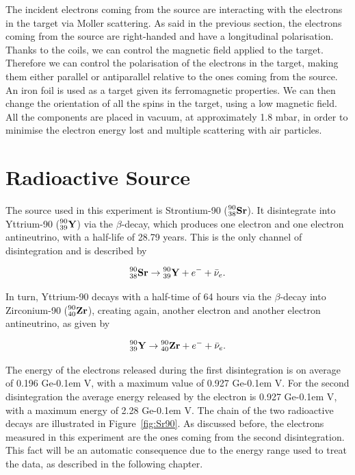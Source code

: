 \documentclass[10pt,swedish, openany]{book}
\def\MeV{\ifmmode {\mathrm{\ Me\kern -0.1em V}}\else
                   \textrm{Ge\kern -0.1em V}\fi}%
\begin{document}
The incident electrons coming from the source are interacting with the electrons in the target via Moller scattering. As said in the previous section, the electrons coming from the source are right-handed and have a longitudinal polarisation. Thanks to the coils, we can control the magnetic field applied to the target. Therefore we can control the polarisation of the electrons in the target, making them either parallel or antiparallel relative to the ones coming from the source. An iron foil is used as a target given its ferromagnetic properties. We can then change the orientation of all the spins in the target, using a low magnetic field. \\

All the components are placed in vacuum, at approximately 1.8 mbar, in order to minimise the electron energy lost and multiple scattering with air particles.

\section{Radioactive Source}

The source used in this experiment is Strontium-90 ($\prescript{90}{38}{\mathbf{Sr}}$). It disintegrate into Yttrium-90 ($\prescript{90}{39}{\mathbf{Y}}$) via the $\beta$-decay, which produces one electron and one electron antineutrino, with a half-life of 28.79 years. This is the only channel of disintegration and is described by

 \begin{equation}
     \prescript{90}{38}{\mathbf{Sr}} \rightarrow \prescript{90}{39}{\mathbf{Y}} + e^- +\bar{\nu}_e.
 \end{equation}
 
 In turn, Yttrium-90 decays with a half-time of 64 hours via the $\beta$-decay into Zirconium-90 ($\prescript{90}{40}{\mathbf{Zr}}$), creating again, another electron and another electron antineutrino, as given by
 
\begin{equation}
     \prescript{90}{39}{\mathbf{Y}} \rightarrow \prescript{90}{40}{\mathbf{Zr}} + e^- +\bar{\nu}_e .
 \end{equation}

The energy of the electrons released during the first disintegration is on average of 0.196 \MeV, with a maximum value of 0.927 \MeV. For the second disintegration the average energy released by the electron is 0.927 \MeV, with a maximum energy of 2.28 \MeV. The chain of the two radioactive decays are illustrated in Figure~\ref{fig:Sr90}. As discussed before, the electrons measured in this experiment are the ones coming from the second disintegration. This fact will be an automatic consequence due to the energy range used to treat the data, as described in the following chapter.
\end{document}
